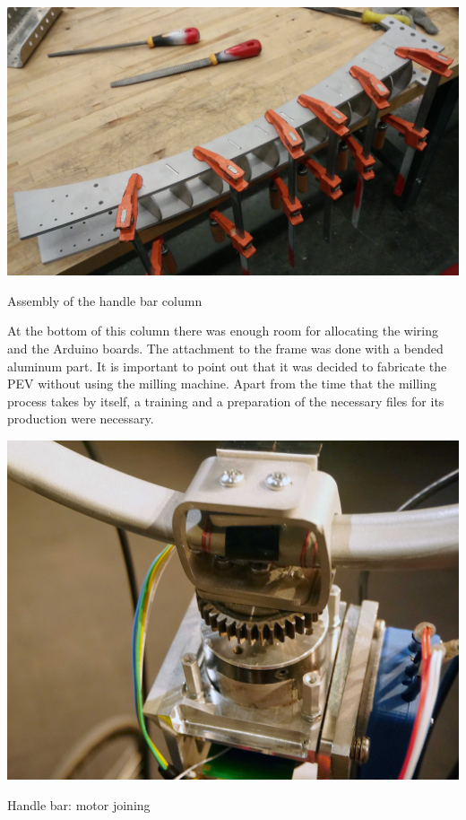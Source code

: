 \begin{marginfigure}[-3cm]
	\includegraphics[width=1\linewidth]{figs/05/IMG_20170207_154911}
	\caption{Assembly of the handle bar column}
	\label{IMG_20170207_154911}
\end{marginfigure}

At the bottom of this column there was enough room for allocating the wiring and the Arduino boards. The attachment to the frame was done with a bended aluminum part. It is important to point out that it was decided to fabricate the PEV without using the milling machine. Apart from the time that the milling process takes by itself, a training and a preparation of the necessary files for its production were necessary.

\begin{marginfigure}[0cm]
	\includegraphics[width=1\linewidth]{figs/05/P1050738}
	\caption{Handle bar: motor joining}
	\label{P1050738}
\end{marginfigure}

